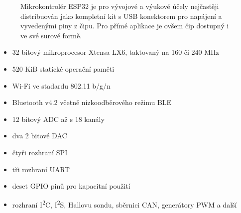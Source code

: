 \begin{figure}
    \centering


    \caption{Mikrokontrolér ESP32 je pro vývojové a výukové účely nejčastěji distribuován jako kompletní kit s USB
    konektorem pro napájení a vyvedenými piny z čipu. %
    Pro přímé aplikace je ovšem čip dostupný i ve své surové formě.}

\end{figure}

\begin{itemize}
    \item 32 bitový mikroprocesor Xtensa LX6, taktovaný na 160 či 240 MHz
    \item 520 KiB statické operační paměti
    \item Wi-Fi ve stadardu 802.11 b/g/n
    \item Bluetooth v4.2 včetně nízkoodběrového režimu BLE
    \item 12 bitový ADC až s 18 kanály
    \item dva 2 bitové DAC
    \item čtyři rozhraní SPI
    \item tři rozhraní UART
    \item deset GPIO pinů pro kapacitní použití
    \item rozhraní I\textsuperscript{2}C, I\textsuperscript{2}S, Hallovu sondu, sběrnici CAN, generátory PWM a další
\end{itemize}

